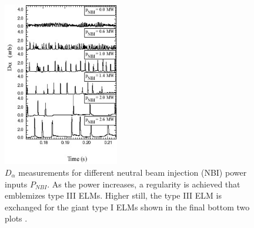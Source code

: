 \documentclass[11pt,titlepage]{report}
\begin{document}
\begin{figure}[h!]
  \centering
    \includegraphics[width=0.45\textwidth]{graphics/ELM_traces}
  \caption{$D_{\alpha}$ measurements for different neutral beam injection (NBI) power inputs $P_{NBI}$. As the power increases, a regularity is achieved that emblemizes type III ELMs. Higher still, the type III ELM is exchanged for the giant type I ELMs shown in the final bottom two plots \cite{ConnorXX}.}
  \label{fig:ELM_traces}
\end{figure}
\end{document}
